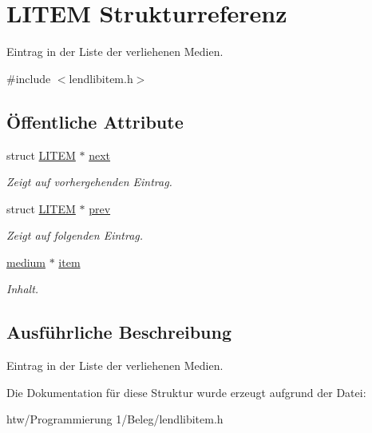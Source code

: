 \hypertarget{struct_l_i_t_e_m}{}\section{L\+I\+T\+EM Strukturreferenz}
\label{struct_l_i_t_e_m}


Eintrag in der Liste der verliehenen Medien.  




{\ttfamily \#include $<$lendlibitem.\+h$>$}

\subsection*{Öffentliche Attribute}
\begin{DoxyCompactItemize}
\item 
struct \hyperlink{struct_l_i_t_e_m}{L\+I\+T\+EM} $\ast$ \hyperlink{struct_l_i_t_e_m_a6e0c549d409d35c7940172c6833afd31}{next}\hypertarget{struct_l_i_t_e_m_a6e0c549d409d35c7940172c6833afd31}{}\label{struct_l_i_t_e_m_a6e0c549d409d35c7940172c6833afd31}

\begin{DoxyCompactList}\small\item\em Zeigt auf vorhergehenden Eintrag. \end{DoxyCompactList}\item 
struct \hyperlink{struct_l_i_t_e_m}{L\+I\+T\+EM} $\ast$ \hyperlink{struct_l_i_t_e_m_ace45a5d25d4387321e5b4ea3565a82e3}{prev}\hypertarget{struct_l_i_t_e_m_ace45a5d25d4387321e5b4ea3565a82e3}{}\label{struct_l_i_t_e_m_ace45a5d25d4387321e5b4ea3565a82e3}

\begin{DoxyCompactList}\small\item\em Zeigt auf folgenden Eintrag. \end{DoxyCompactList}\item 
\hyperlink{structmedium}{medium} $\ast$ \hyperlink{struct_l_i_t_e_m_a6d7a2e7ba2f3556d7c66c9fe9d116af8}{item}\hypertarget{struct_l_i_t_e_m_a6d7a2e7ba2f3556d7c66c9fe9d116af8}{}\label{struct_l_i_t_e_m_a6d7a2e7ba2f3556d7c66c9fe9d116af8}

\begin{DoxyCompactList}\small\item\em Inhalt. \end{DoxyCompactList}\end{DoxyCompactItemize}


\subsection{Ausführliche Beschreibung}
Eintrag in der Liste der verliehenen Medien. 

Die Dokumentation für diese Struktur wurde erzeugt aufgrund der Datei\+:\begin{DoxyCompactItemize}
\item 
htw/\+Programmierung 1/\+Beleg/lendlibitem.\+h\end{DoxyCompactItemize}
